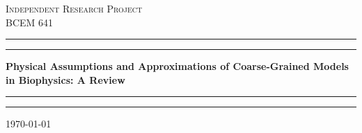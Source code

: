 \begin{titlepage}

\newcommand{\HRule}{\rule{\linewidth}{0.5mm}} %

\center %
\scshape
 

\textsc{\Large Independent Research Project}\\[0.6cm] %
\textsc{\large \textsc{BCEM} 641 \large}\\[0.6cm] %


    \rule{\textwidth}{1.6pt}\vspace*{-\baselineskip}\vspace*{2pt} %
	\rule{\textwidth}{0.4pt} %
	\vspace{0.1\baselineskip} %
	
	{\LARGE \bfseries Physical Assumptions and Approximations of Coarse-Grained Models in Biophysics: A Review\\} %
	
	\vspace{0.75\baselineskip} %
	\rule{\textwidth}{0.4pt}\vspace*{-\baselineskip}\vspace{3.2pt} %
	\rule{\textwidth}{1.6pt} %
	\vspace{2\baselineskip} %
 
 {\large \today}\\[1cm] %
 


\end{titlepage}
